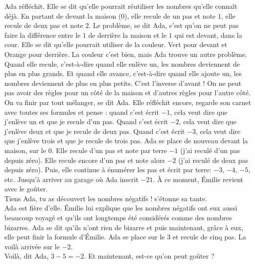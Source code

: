 Ada réfléchit. 
Elle se dit qu’elle pourrait réutiliser les nombres qu’elle connaît déjà. En partant de devant la maison ($0$), elle recule de un pas et note $1$, elle recule de deux pas et note $2$. 
Le problème, se dit Ada, c’est qu’on ne peut pas faire la différence entre le $1$ de derrière la maison et le $1$ qui est devant, dans la cour. 
Elle se dit qu’elle pourrait utiliser de la couleur. 
Vert pour devant et Orange pour derrière. 
La couleur c’est bien, mais Ada trouve un autre problème. 
Quand elle recule, c'est-à-dire quand elle enlève un, les nombres deviennent de plus en plus grands. Et quand elle avance, c’est-à-dire quand elle ajoute un, les nombres deviennent de plus en plus petits.
C’est l’inverse d’avant ! On ne peut pas avoir des règles pour un côté de la maison et d’autres règles pour l’autre côté. 
On va finir par tout mélanger, se dit Ada. 
Elle réfléchit encore, regarde son carnet avec toutes ses formules et pense : quand c’est écrit $-1$, cela veut dire que j’enlève un et que je recule d’un pas. Quand c’est écrit $-2$, cela veut dire que j’enlève deux et que je recule de deux pas. Quand c’est écrit $-3$, cela veut dire que j’enlève trois et que je recule de trois pas. 
Ada se place de nouveau devant la maison, sur le $0$. Elle recule d’un pas et note par terre $-1$ (j’ai reculé d’un pas depuis zéro). Elle recule encore d’un pas et note alors $-2$ (j’ai reculé de deux pas depuis zéro). Puis, elle continue à énumérer les pas et écrit par terre: $-3$, $-4$, $-5$, etc. 
Jusqu'à arriver au garage où Ada inscrit $-21$. 
À ce moment, Émilie revient avec le goûter.\\
\guillemotleft Tiens Ada, tu as découvert les nombres négatifs ! s’étonne sa tante. \guillemotright\\
Ada est fière d’elle. Émilie lui explique que les nombres négatifs ont eux aussi beaucoup voyagé et qu’ils ont longtemps été considérés comme des nombres bizarres. Ada se dit qu’ils n’ont rien de bizarre et puis maintenant, grâce à eux, elle peut finir la formule d’Émilie. Ada se place sur le $3$ et recule de cinq pas. La voilà arrivée sur le $-2$.\\
\guillemotleft Voilà, dit Ada, $3 - 5 = -2$. Et maintenant, est-ce qu’on peut goûter ? \guillemotright

%    
